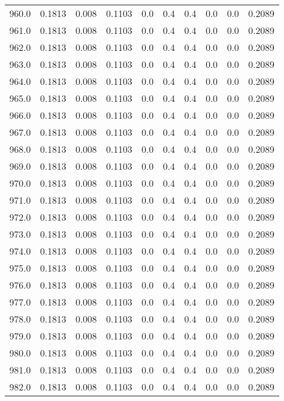 \begin{longtable}{lrrrrrrrrr}
960.0 & 0.1813 & 0.008 & 0.1103 & 0.0 & 0.4 & 0.4 & 0.0 & 0.0 & 0.2089 \\
961.0 & 0.1813 & 0.008 & 0.1103 & 0.0 & 0.4 & 0.4 & 0.0 & 0.0 & 0.2089 \\
962.0 & 0.1813 & 0.008 & 0.1103 & 0.0 & 0.4 & 0.4 & 0.0 & 0.0 & 0.2089 \\
963.0 & 0.1813 & 0.008 & 0.1103 & 0.0 & 0.4 & 0.4 & 0.0 & 0.0 & 0.2089 \\
964.0 & 0.1813 & 0.008 & 0.1103 & 0.0 & 0.4 & 0.4 & 0.0 & 0.0 & 0.2089 \\
965.0 & 0.1813 & 0.008 & 0.1103 & 0.0 & 0.4 & 0.4 & 0.0 & 0.0 & 0.2089 \\
966.0 & 0.1813 & 0.008 & 0.1103 & 0.0 & 0.4 & 0.4 & 0.0 & 0.0 & 0.2089 \\
967.0 & 0.1813 & 0.008 & 0.1103 & 0.0 & 0.4 & 0.4 & 0.0 & 0.0 & 0.2089 \\
968.0 & 0.1813 & 0.008 & 0.1103 & 0.0 & 0.4 & 0.4 & 0.0 & 0.0 & 0.2089 \\
969.0 & 0.1813 & 0.008 & 0.1103 & 0.0 & 0.4 & 0.4 & 0.0 & 0.0 & 0.2089 \\
970.0 & 0.1813 & 0.008 & 0.1103 & 0.0 & 0.4 & 0.4 & 0.0 & 0.0 & 0.2089 \\
971.0 & 0.1813 & 0.008 & 0.1103 & 0.0 & 0.4 & 0.4 & 0.0 & 0.0 & 0.2089 \\
972.0 & 0.1813 & 0.008 & 0.1103 & 0.0 & 0.4 & 0.4 & 0.0 & 0.0 & 0.2089 \\
973.0 & 0.1813 & 0.008 & 0.1103 & 0.0 & 0.4 & 0.4 & 0.0 & 0.0 & 0.2089 \\
974.0 & 0.1813 & 0.008 & 0.1103 & 0.0 & 0.4 & 0.4 & 0.0 & 0.0 & 0.2089 \\
975.0 & 0.1813 & 0.008 & 0.1103 & 0.0 & 0.4 & 0.4 & 0.0 & 0.0 & 0.2089 \\
976.0 & 0.1813 & 0.008 & 0.1103 & 0.0 & 0.4 & 0.4 & 0.0 & 0.0 & 0.2089 \\
977.0 & 0.1813 & 0.008 & 0.1103 & 0.0 & 0.4 & 0.4 & 0.0 & 0.0 & 0.2089 \\
978.0 & 0.1813 & 0.008 & 0.1103 & 0.0 & 0.4 & 0.4 & 0.0 & 0.0 & 0.2089 \\
979.0 & 0.1813 & 0.008 & 0.1103 & 0.0 & 0.4 & 0.4 & 0.0 & 0.0 & 0.2089 \\
980.0 & 0.1813 & 0.008 & 0.1103 & 0.0 & 0.4 & 0.4 & 0.0 & 0.0 & 0.2089 \\
981.0 & 0.1813 & 0.008 & 0.1103 & 0.0 & 0.4 & 0.4 & 0.0 & 0.0 & 0.2089 \\
982.0 & 0.1813 & 0.008 & 0.1103 & 0.0 & 0.4 & 0.4 & 0.0 & 0.0 & 0.2089 \\

\end{longtable}
